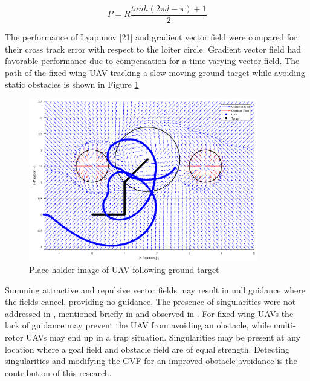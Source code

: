 \documentclass[numbered,pdftex]{ohio-etd}
\begin{document}
 
 
 \begin{equation}
 P = R\frac{tanh(2\pi d-\pi)+1}{2}
 \label{repulsiveDecay}
 \end{equation}
 

 
 The performance of Lyapunov [21] and gradient vector field \cite{goncalves_artificial_2009,goncalves_circulation_2010,goncalves_vector_2010} were compared for their cross track error with respect to the loiter circle. Gradient vector field had favorable performance due to compensation for a time-varying vector field. The path of the fixed wing UAV tracking a slow moving ground target while avoiding static obstacles is shown in Figure \ref{fig:gvfMovingTarget}


\begin{figure}[h]
	\centering
	\includegraphics[width=10cm]{PaperFigures/gvfMovingTarget}
	\caption{Place holder image of UAV following ground target \cite{wwc}}
	\label{fig:gvfMovingTarget}
\end{figure}

Summing attractive and repulsive vector fields may result in null guidance where the fields cancel, providing no guidance. The presence of singularities were not addressed in \cite{wwc}, mentioned briefly in \cite{nelson_cooperative_2005} and observed in \cite{panagou_motion_2014}. For fixed wing UAVs the lack of guidance may prevent the UAV from avoiding an obstacle, while multi-rotor UAVs may end up in a trap situation. Singularities may be present at any location where a goal field and obstacle field are of equal strength. Detecting singularities and modifying the GVF for an improved obstacle avoidance is the contribution of this research.
\end{document}
